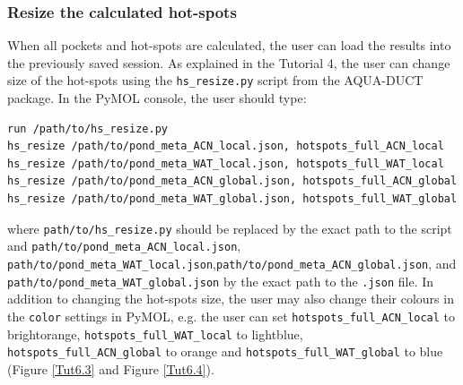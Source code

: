 \documentclass[9pt,tutorial]{livecoms}
\begin{document}
\subsubsection{Resize the calculated hot-spots}
When all pockets and hot-spots are calculated, the user can load the results into the previously saved session. As explained in the Tutorial 4, the user can change size of the hot-spots using the \texttt{hs\_resize.py} script from the AQUA-DUCT package. In the PyMOL console, the user should type:
\begin{lstlisting}[columns=fullflexible]
run /path/to/hs_resize.py
hs_resize /path/to/pond_meta_ACN_local.json, hotspots_full_ACN_local
hs_resize /path/to/pond_meta_WAT_local.json, hotspots_full_WAT_local
hs_resize /path/to/pond_meta_ACN_global.json, hotspots_full_ACN_global
hs_resize /path/to/pond_meta_WAT_global.json, hotspots_full_WAT_global
\end{lstlisting}
where \texttt{path/to/hs\_resize.py} should be replaced by the exact path to the script and \texttt{path/to/pond\_meta\_ACN\_local.json}, \texttt{path/to/pond\_meta\_WAT\_local.json},\newline \texttt{path/to/pond\_meta\_ACN\_global.json}, and \newline \texttt{path/to/pond\_meta\_WAT\_global.json} by the exact path to the \texttt{.json} file.
In addition to changing the hot-spots size, the user may also change their colours in the \texttt{color} settings in PyMOL, e.g. the user can set \texttt{hotspots\_full\_ACN\_local} to brightorange, \texttt{hotspots\_full\_WAT\_local} to lightblue, \texttt{hotspots\_full\_ACN\_global} \hfill to \hfill orange \hfill and \newline \texttt{hotspots\_full\_WAT\_global} to blue (Figure \ref{Tut6.3} and Figure \ref{Tut6.4}).
\end{document}
